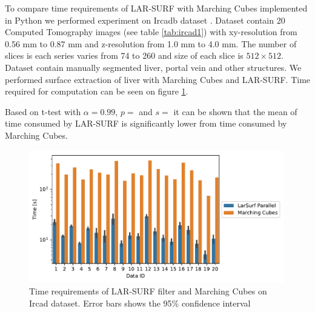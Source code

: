 To compare time requirements of LAR-SURF with Marching Cubes implemented in Python we performed experiment on Ircadb dataset \cite{ircad}. Dataset contain 20 Computed Tomography images (see table \ref{tab:ircad1}) with xy-resolution from 0.56 mm to 0.87 mm and z-resolution from 1.0 mm to 4.0 mm. The number of slices is each series varies from 74 to 260 and size of each slice is $512\times512$. Dataset contain manually segmented liver, portal vein and other structures. We performed surface extraction of liver with Marching Cubes and LAR-SURF. Time required for computation can be seen on figure \ref{fig:ircad_comparison}. 

Based on t-test with $\alpha=0.99$, $p=$ and 
$s=$ it can be shown that the mean of time consumed by LAR-SURF is significantly lower from time consumed by Marching Cubes.


\begin{figure}
\centering
\includegraphics[width=0.99\textwidth]{figs/ircad_comparison.pdf} 
\caption{Time requirements of LAR-SURF filter and Marching Cubes on Ircad dataset. Error bars shows the 95\% confidence interval}
\label{fig:ircad_comparison}
\end{figure}




